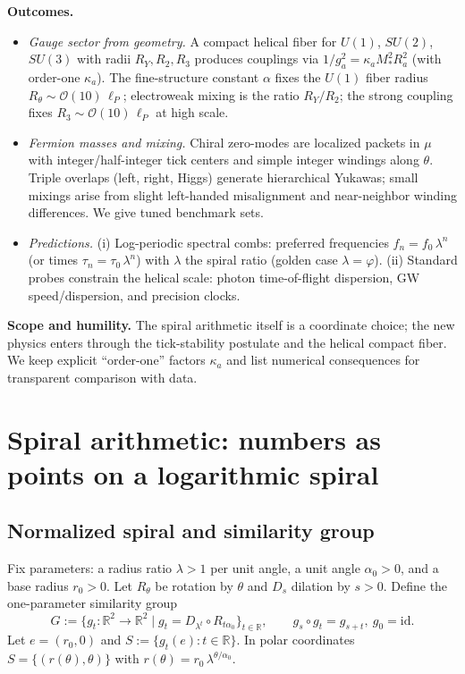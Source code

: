 \documentclass[11pt]{article}
\newcommand{\R}{\mathbb{R}}
\begin{document}
\textbf{Outcomes.}
\begin{itemize}
\item \emph{Gauge sector from geometry.} A compact helical fiber for \(U(1)\), \(SU(2)\), \(SU(3)\) with radii \(R_Y,R_2,R_3\) produces couplings via \(1/g_a^2=\kappa_a M_*^2 R_a^2\) (with order-one \(\kappa_a\)). The fine-structure constant \(\alpha\) fixes the \(U(1)\) fiber radius \(R_\theta\sim \mathcal{O}(10)\,\ell_P\); electroweak mixing is the ratio \(R_Y/R_2\); the strong coupling fixes \(R_3\sim \mathcal{O}(10)\,\ell_P\) at high scale.
\item \emph{Fermion masses and mixing.} Chiral zero-modes are localized packets in \(\mu\) with integer/half-integer tick centers and simple integer windings along \(\theta\).
Triple overlaps (left, right, Higgs) generate hierarchical Yukawas; small mixings arise from slight left-handed misalignment and near-neighbor winding differences. We give tuned benchmark sets.
\item \emph{Predictions.} (i) Log-periodic spectral combs: preferred frequencies \(f_n=f_0\,\lambda^n\) (or times \(\tau_n=\tau_0\,\lambda^n\)) with \(\lambda\) the spiral ratio (golden case \(\lambda=\varphi\)).
(ii) Standard probes constrain the helical scale: photon time-of-flight dispersion, GW speed/dispersion, and precision clocks.
\end{itemize}

\textbf{Scope and humility.}
The spiral arithmetic itself is a coordinate choice; the new physics enters through the tick-stability postulate and the helical compact fiber.
We keep explicit ``order-one'' factors \(\kappa_a\) and list numerical consequences for transparent comparison with data.

\section{Spiral arithmetic: numbers as points on a logarithmic spiral}
\subsection{Normalized spiral and similarity group}
Fix parameters: a radius ratio \(\lambda>1\) per unit angle, a unit angle \(\alpha_0>0\), and a base radius \(r_0>0\).
Let \(R_\theta\) be rotation by \(\theta\) and \(D_s\) dilation by \(s>0\).
Define the one-parameter similarity group
\begin{equation}
G:=\{g_t:\R^2\to\R^2\mid g_t= D_{\lambda^{t}}\circ R_{t\alpha_0}\}_{t\in\R},\qquad
g_s\circ g_t=g_{s+t},\ g_0=\mathrm{id}.
\end{equation}
Let \(e=(r_0,0)\) and \(S:=\{g_t(e):t\in\R\}\).
In polar coordinates \(S=\{(r(\theta),\theta)\}\) with \(r(\theta)=r_0\,\lambda^{\theta/\alpha_0}\).
\end{document}
